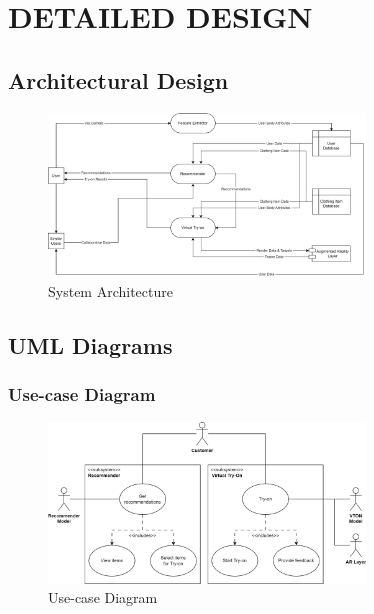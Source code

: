 \chapter[Detailed Design]{DETAILED DESIGN}

\section{Architectural Design}
	\begin{figure}[h!]
		\centering
		\includegraphics[width=0.75\textwidth]{components/images/sys-arch.png}
		\caption{System Architecture}
		\label{fig:sys-arch}
	\end{figure}

\section{UML Diagrams}
	\subsection{Use-case Diagram}
		\begin{figure}[h!]
			\centering
			\includegraphics[width=0.75\textwidth]{components/images/use-case.png}
			\caption{Use-case Diagram}
			\label{fig:use-case-rep}
		\end{figure}

	\pagebreak

